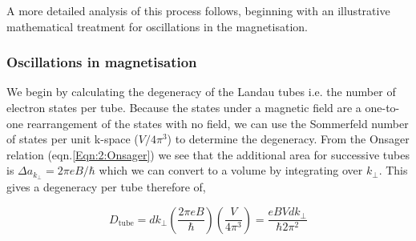 A more detailed analysis of this process follows, beginning with an illustrative mathematical treatment for oscillations in the magnetisation.

\subsubsection{Oscillations in magnetisation}

We begin by calculating the degeneracy of the Landau tubes i.e. the number of electron states per tube. Because the states under a magnetic field are a one-to-one rearrangement of the states with no field, we can use the Sommerfeld number of states per unit k-space ($V/4\pi^3$) to determine the degeneracy. From the Onsager relation (eqn.\ref{Eqn:2:Onsager}) we see that the additional area for successive tubes is $\Delta a_{k_{\perp}}  = 2\pi e B/\hbar$ which we can convert to a volume by integrating over $k_{\perp}$. This gives a degeneracy per tube therefore of,

\begin{equation}
D_{\textrm{tube}} = d k_{\perp}\left(\frac{2\pi e B}{\hbar}\right)\left(\frac{V}{4 \pi^3}\right) = \frac{eBVdk_{\perp}}{\hbar 2\pi^2}
\end{equation}


